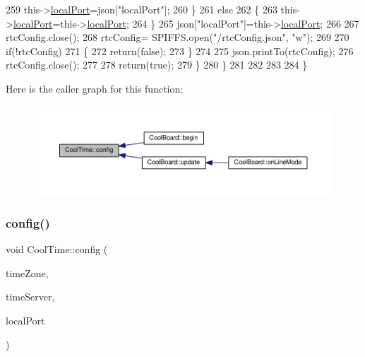 \begin{DoxyCode}
259                 this->\hyperlink{classCoolTime_a2f777da44d7ba678be8185299e9b49d1}{localPort}=json[\textcolor{stringliteral}{"localPort"}];
260             \}
261             \textcolor{keywordflow}{else}
262             \{
263                 this->\hyperlink{classCoolTime_a2f777da44d7ba678be8185299e9b49d1}{localPort}=this->\hyperlink{classCoolTime_a2f777da44d7ba678be8185299e9b49d1}{localPort};
264             \}
265             json[\textcolor{stringliteral}{"localPort"}]=this->\hyperlink{classCoolTime_a2f777da44d7ba678be8185299e9b49d1}{localPort};
266 
267             rtcConfig.close();
268             rtcConfig= SPIFFS.open(\textcolor{stringliteral}{"/rtcConfig.json"}, \textcolor{stringliteral}{"w"});
269             
270             \textcolor{keywordflow}{if}(!rtcConfig)
271             \{
272                 \textcolor{keywordflow}{return}(\textcolor{keyword}{false});
273             \}
274             
275             json.printTo(rtcConfig);
276             rtcConfig.close();
277                         
278             \textcolor{keywordflow}{return}(\textcolor{keyword}{true}); 
279         \}
280     \}   
281 
282 
283 
284 \}
\end{DoxyCode}
Here is the caller graph for this function\+:
\nopagebreak
\begin{figure}[H]
\begin{center}
\leavevmode
\includegraphics[width=350pt]{classCoolTime_a87c28260c1bc77091162cbcf1ee2e129_icgraph}
\end{center}
\end{figure}
\mbox{\label{classCoolTime_ae5528ed0ba9e78c711084968054950e0}} 
\subsubsection{\texorpdfstring{config()}{config()}\hspace{0.1cm}{\footnotesize\ttfamily [2/2]}}
{\footnotesize\ttfamily void Cool\+Time\+::config (\begin{DoxyParamCaption}\item[{int}]{time\+Zone,  }\item[{I\+P\+Address}]{time\+Server,  }\item[{unsigned int}]{local\+Port }\end{DoxyParamCaption})}

